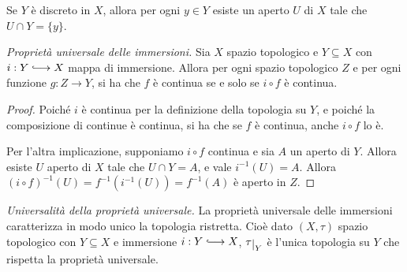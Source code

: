 \documentclass{article}
\begin{document}
\begin{oss}
    Se $Y$ \`e discreto in $X$, allora per ogni $y \in Y$ esiste un aperto $U$
    di $X$ tale che $U \cap Y = \{y\}$.
\end{oss}

\begin{thm}
    \emph{Proprietà universale delle immersioni.} Sia $X$ spazio topologico e $Y
    \subseteq X$ con $i: Y \hooklongrightarrow X$ mappa di immersione. Allora
    per ogni spazio topologico $Z$ e per ogni funzione $g: Z \longrightarrow Y$,
    si ha che $f$ \`e continua se e solo se $i \circ f$ \`e continua.
\end{thm}

\begin{proof}
    Poiché $i$ \`e continua per la definizione della topologia su $Y$, e poiché
    la composizione di continue \`e continua, si ha che se $f$ \`e continua,
    anche $i \circ f$ lo \`e.

    Per l'altra implicazione, supponiamo $i \circ f$ continua e sia $A$ un
    aperto di $Y$. Allora esiste $U$ aperto di $X$ tale che ${U\cap Y = A}$, e
    vale ${i^{-1}(U) = A}$. Allora $(i\circ f)^{-1}(U) = f^{-1}(i^{-1}(U)) =
    f^{-1}(A)$ \`e aperto in $Z$.
\end{proof}

\begin{thm}
    \emph{Universalit\`a della proprietà universale.} La proprietà universale
    delle immersioni caratterizza in modo unico la topologia ristretta. Cio\`e
    dato $(X, \tau)$ spazio topologico con $Y \subseteq X$ e immersione ${i: Y
    \hooklongrightarrow X}$, $\tau\restrict{Y}$ \`e l'unica topologia su $Y$ che
    rispetta la proprietà universale.
\end{thm}
\end{document}
